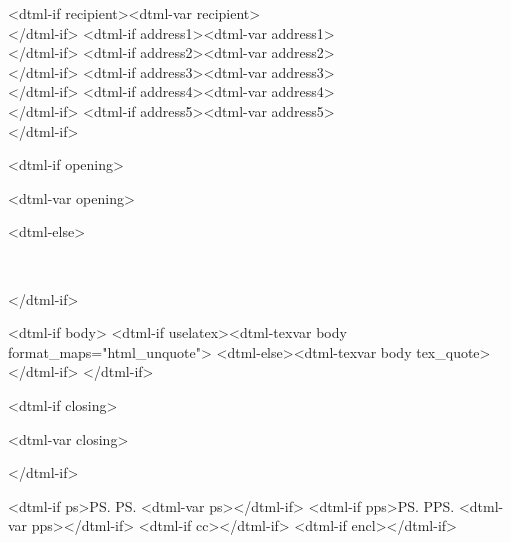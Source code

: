\documentclass[letterpaper]{mscsletter2015}
\begin{document}
\begin{letter}{
<dtml-if recipient><dtml-var recipient>\\
</dtml-if>
<dtml-if address1><dtml-var address1>\\
</dtml-if>
<dtml-if address2><dtml-var address2>\\
</dtml-if>
<dtml-if address3><dtml-var address3>\\
</dtml-if>
<dtml-if address4><dtml-var address4>\\
</dtml-if>
<dtml-if address5><dtml-var address5>\\
</dtml-if>
}

<dtml-if opening>\opening{<dtml-var opening>}
<dtml-else>\opening{\ }
</dtml-if>

<dtml-if body>
<dtml-if uselatex><dtml-texvar body format_maps="html_unquote">
<dtml-else><dtml-texvar body tex_quote>
</dtml-if>
</dtml-if>

<dtml-if closing>\closing{<dtml-var closing>}</dtml-if>

<dtml-if ps>\ps{PS. <dtml-var ps>}</dtml-if>
<dtml-if pps>\ps{PPS. <dtml-var pps>}</dtml-if>
<dtml-if cc></dtml-if>    
<dtml-if encl></dtml-if>

\end{letter}
\end{document}
